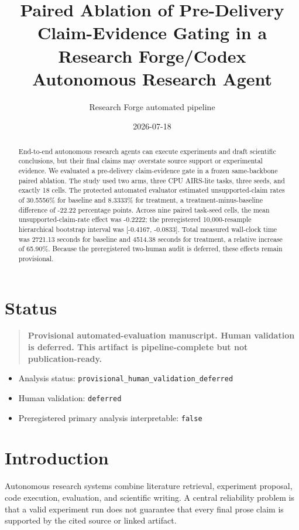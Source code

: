 \documentclass[11pt]{article}
\title{Paired Ablation of Pre-Delivery Claim-Evidence Gating in a Research Forge/Codex Autonomous Research Agent}
\author{Research Forge automated pipeline}
\date{2026-07-18}
\begin{document}
\maketitle

\section*{Status}
\begin{quote}
\textbf{Provisional automated-evaluation manuscript. Human validation is deferred. This artifact is pipeline-complete but not publication-ready.}
\end{quote}
\begin{itemize}[leftmargin=*]
\item Analysis status: \texttt{provisional\_human\_validation\_deferred}
\item Human validation: \texttt{deferred}
\item Preregistered primary analysis interpretable: \texttt{false}
\end{itemize}

\begin{abstract}
End-to-end autonomous research agents can execute experiments and draft scientific conclusions, but their final claims may overstate source support or experimental evidence. We evaluated a pre-delivery claim-evidence gate in a frozen same-backbone paired ablation. The study used two arms, three CPU AIRS-lite tasks, three seeds, and exactly 18 cells. The protected automated evaluator estimated unsupported-claim rates of 30.5556\% for baseline and 8.3333\% for treatment, a treatment-minus-baseline difference of -22.22 percentage points. Across nine paired task-seed cells, the mean unsupported-claim-rate effect was -0.2222; the preregistered 10,000-resample hierarchical bootstrap interval was [-0.4167, -0.0833]. Total measured wall-clock time was 2721.13 seconds for baseline and 4514.38 seconds for treatment, a relative increase of 65.90\%. Because the preregistered two-human audit is deferred, these effects remain provisional.
\end{abstract}

\section{Introduction}
Autonomous research systems combine literature retrieval, experiment proposal, code execution, evaluation, and scientific writing. A central reliability problem is that a valid experiment run does not guarantee that every final prose claim is supported by the cited source or linked artifact.
\end{document}
